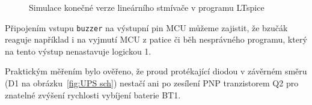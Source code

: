 \begin{figure}
    \centering
    \caption{Simulace konečné verze lineárního stmívače v programu LTspice}
    \label{fig:UPS RC sim}
\end{figure}

Připojením vstupu \texttt{buzzer} na výstupní pin MCU můžeme zajistit, že
bzučák reaguje například i na vyjmutí MCU z patice či běh nesprávného programu,
který na tento výstup nenastavuje logickou 1.

Praktickým měřením bylo ověřeno, že proud protékající diodou v závěrném směru
(D1 na obrázku~\vref{fig:UPS sch}) nestačí ani po zesílení PNP tranzistorem Q2
pro znatelné zvýšení rychlosti vybíjení baterie BT1.
